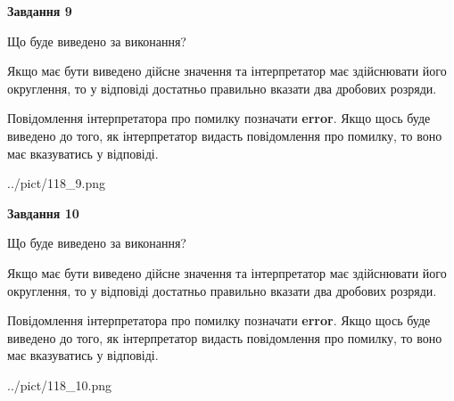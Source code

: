\documentclass[12pt, ukrainian]{article}
\begin{document}
{\begin {Large}
{\begin {center}\textbf{Завдання 9}\end {center}}\par
Що буде виведено за виконання? \par

Якщо має бути виведено дійсне значення та інтерпретатор має здійснювати його округлення, 
то у відповіді достатньо правильно вказати два дробових розряди.

Повідомлення інтерпретатора про помилку позначати \textbf{error}.
Якщо щось буде виведено до того, як інтерпретатор видасть повідомлення про помилку, 
то воно має вказуватись у відповіді. \par

\begin{center}
	{../pict/118_9.png}
\end{center}
\newpage

{\begin {center}\textbf{Завдання 10}\end {center}}\par
Що буде виведено за виконання? \par

Якщо має бути виведено дійсне значення та інтерпретатор має здійснювати його округлення, 
то у відповіді достатньо правильно вказати два дробових розряди.

Повідомлення інтерпретатора про помилку позначати \textbf{error}.
Якщо щось буде виведено до того, як інтерпретатор видасть повідомлення про помилку, 
то воно має вказуватись у відповіді. \par

\begin{center}
	{../pict/118_10.png}
\end{center}
\newpage

\end {Large}}
\end{document}
